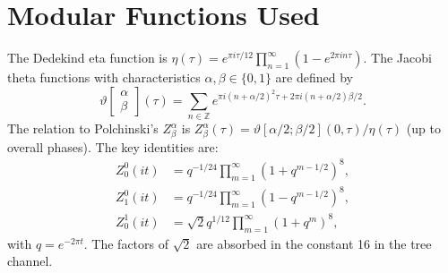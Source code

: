 \documentclass[11pt,a4paper]{article}
\begin{document}
\section{Modular Functions Used}
The Dedekind eta function is $\eta(\tau) = e^{\pi i \tau/12} \prod_{n=1}^\infty (1 - e^{2\pi i n \tau})$. The Jacobi theta functions with characteristics $\alpha,\beta \in \{0,1\}$ are defined by
\begin{equation}
\vartheta\begin{bmatrix}\alpha\\ \beta\end{bmatrix}(\tau) = \sum_{n\in\mathbb{Z}} e^{\pi i (n+\alpha/2)^2 \tau + 2\pi i (n+\alpha/2)\beta/2}.
\end{equation}
The relation to Polchinski's $Z^\alpha_\beta$ is $Z^\alpha_\beta(\tau) = \vartheta[\alpha/2;\beta/2](0,\tau)/\eta(\tau)$ (up to overall phases). The key identities are:
\begin{align}
Z^0_0(it) &= q^{-1/24} \prod_{m=1}^\infty (1+q^{m-1/2})^8,\\
Z^0_1(it) &= q^{-1/24} \prod_{m=1}^\infty (1-q^{m-1/2})^8,\\
Z^1_0(it) &= \sqrt{2} q^{1/12} \prod_{m=1}^\infty (1+q^m)^8,
\end{align}
with $q=e^{-2\pi t}$. The factors of $\sqrt{2}$ are absorbed in the constant 16 in the tree channel.
\end{document}
